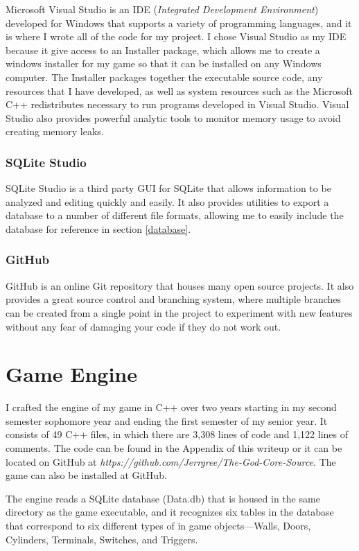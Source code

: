 \documentclass{article}
\begin{document}
Microsoft Visual Studio is an IDE (\emph{Integrated Development Environment}) developed for Windows that supports a variety of programming languages, and it is where I wrote all of the code for my project. I chose Visual Studio as my IDE because it give access to an Installer package, which allows me to create a windows installer for my game so that it can be installed on any Windows computer. The Installer packages together the executable source code, any resources that I have developed, as well as system resources such as the Microsoft C++ redistributes necessary to run programs developed in Visual Studio. Visual Studio also provides powerful analytic tools to monitor memory usage to avoid creating memory leaks.

\subsubsection{SQLite Studio}

SQLite Studio is a third party GUI for SQLite that allows information to be analyzed and editing quickly and easily. It also provides utilities to export a database to a number of different file formats, allowing me to easily include the database for reference in section \ref{database}.

\subsubsection{GitHub}

GitHub is an online Git repository that houses many open source projects. It also provides a great source control and branching system, where multiple branches can be created from a single point in the project to experiment with new features without any fear of damaging your code if they do not work out.

\section{Game Engine}

I crafted the engine of my game in C++ over two years starting in my second semester sophomore year and ending the first semester of my senior year. It consists of 49 C++ files, in which there are 3,308 lines of code and 1,122 lines of comments. The code can be found in the Appendix of this writeup or it can be located on GitHub at \emph{https://github.com/Jerrgree/The-God-Core-Source}. The game can also be installed at GitHub.

The engine reads a SQLite database (Data.db) that is housed in the same directory as the game executable, and it recognizes six tables in the database that correspond to six different types of in game objects---Walls, Doors, Cylinders, Terminals, Switches, and Triggers.
\end{document}
